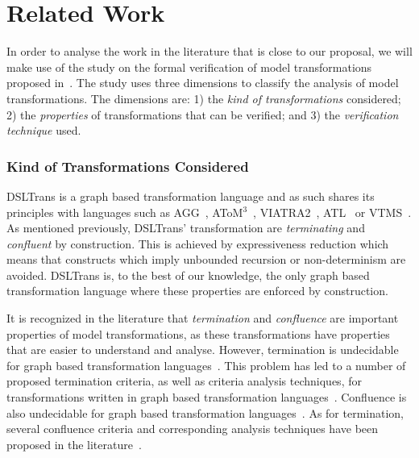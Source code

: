 \section{Related Work}
\label{sec:related_work}

In order to analyse the work in the literature that is close to our proposal, we will make use of the study on the formal verification of model transformations proposed in~\cite{DBLP:conf/icst/AmraniLSCDVTC12}. The study uses three dimensions to classify the analysis of model transformations. The dimensions are: 1) the \emph{kind of transformations} considered; 2) the \emph{properties} of transformations that can be verified; and 3) the \emph{verification technique} used.

\subsubsection*{Kind of Transformations Considered} DSLTrans is a graph based transformation language and as such shares its principles with languages such as AGG~\cite{Taentzer2000}, AToM$^3$~\cite{atom3:2002}, VIATRA2~\cite{DBLP:conf/uml/VarroP04}, ATL~\cite{Jouault200831} or VTMS~\cite{DBLP:journals/entcs/LevendovszkyLMC05}. As mentioned previously, DSLTrans' transformation are \emph{terminating} and \emph{confluent} by construction. This is achieved by expressiveness reduction which means that constructs which imply unbounded recursion or non-determinism are avoided. DSLTrans is, to the best of our knowledge, the only graph based transformation language where these properties are enforced by construction.

It is recognized in the literature that \emph{termination} and \emph{confluence} are important properties of model transformations, as these transformations have properties that are easier to understand and analyse. However, termination is undecidable for graph based transformation languages~\cite{DBLP:journals/fuin/Plump98}. This problem has led to a number of proposed termination criteria, as well as criteria analysis techniques, for transformations written in graph based transformation languages~\cite{deLara:2010:ATA:1815798.1815800,EhrigEhrigTaentzerdeLaraVarroVarro2005,Varro-Varro-etAl-2006,J:Bruggink2008,J:Kuster2006}. Confluence is also undecidable for graph based transformation languages~\cite{Plump2005}. As for termination, several confluence criteria and corresponding analysis techniques have been proposed in the literature~\cite{HeckelKT02,J:Kuster2006,J:Lambers-etAl-2006,J:Biermann2011}.

